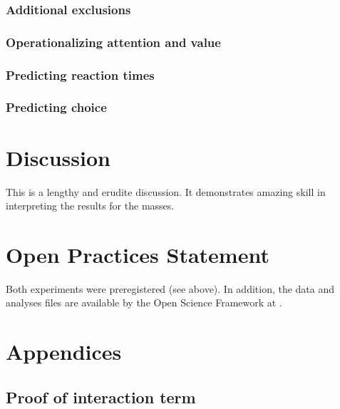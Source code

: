 \documentclass[doc, a4paper, apacite]{apa6}
\begin{document}
\subsubsection{Additional exclusions}

\subsubsection{Operationalizing attention and value}

\subsubsection{Predicting reaction times}

\subsubsection{Predicting choice}



\section{Discussion}
This is a lengthy and erudite discussion.  It demonstrates amazing
skill in interpreting the results for the masses.

\section{Open Practices Statement}
Both experiments were preregistered (see above). In addition, the data and analyses files are available by the Open Science Framework at \url{}. 

\clearpage
\newpage



\clearpage
\newpage
\section{Appendices}

\subsection{Proof of interaction term}
\end{document}
